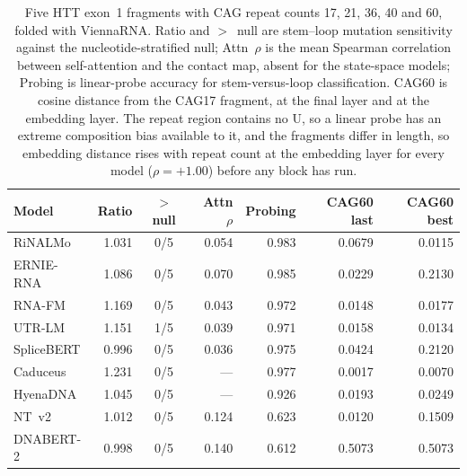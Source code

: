 \begin{table}[htbp]
\centering
\caption{Five HTT exon~1 fragments with CAG repeat counts 17, 21, 36, 40 and 60, folded with ViennaRNA. Ratio and $>$~null are stem--loop mutation sensitivity against the nucleotide-stratified null; Attn~$\rho$ is the mean Spearman correlation between self-attention and the contact map, absent for the state-space models; Probing is linear-probe accuracy for stem-versus-loop classification. CAG60 is cosine distance from the CAG17 fragment, at the final layer and at the embedding layer. The repeat region contains no U, so a linear probe has an extreme composition bias available to it, and the fragments differ in length, so embedding distance rises with repeat count at the embedding layer for every model ($\rho = +1.00$) before any block has run.}
\label{tab:htt}
\small
\begin{tabular}{@{}lrcrrrr@{}}
\toprule
\textbf{Model} & \textbf{Ratio} & \textbf{$>$ null} & \textbf{Attn $\rho$} & \textbf{Probing} & \textbf{CAG60 last} & \textbf{CAG60 best} \\
\midrule
RiNALMo & 1.031 & 0/5 & 0.054 & 0.983 & 0.0679 & 0.0115 \\
ERNIE-RNA & 1.086 & 0/5 & 0.070 & 0.985 & 0.0229 & 0.2130 \\
RNA-FM & 1.169 & 0/5 & 0.043 & 0.972 & 0.0148 & 0.0177 \\
UTR-LM & 1.151 & 1/5 & 0.039 & 0.971 & 0.0158 & 0.0134 \\
SpliceBERT & 0.996 & 0/5 & 0.036 & 0.975 & 0.0424 & 0.2120 \\
Caduceus & 1.231 & 0/5 & --- & 0.977 & 0.0017 & 0.0070 \\
HyenaDNA & 1.045 & 0/5 & --- & 0.926 & 0.0193 & 0.0249 \\
NT~v2 & 1.012 & 0/5 & 0.124 & 0.623 & 0.0120 & 0.1509 \\
DNABERT-2 & 0.998 & 0/5 & 0.140 & 0.612 & 0.5073 & 0.5073 \\
\bottomrule
\end{tabular}
\end{table}
